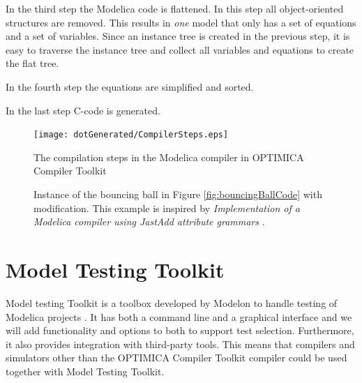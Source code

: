 \documentclass{cslthse-msc}
\begin{document}
In the third step the Modelica code is flattened. In this step all object-oriented structures are removed. This results in \emph{one} model that only has a set of equations and a set of variables. Since an instance tree is created in the previous step, it is easy to traverse the instance tree and collect all variables and equations to create the flat tree.

In the fourth step the equations are simplified and sorted.

In the last step C-code is generated. 

\begin{figure}[!htbp]
    \centering
    {\texttt{[image: dotGenerated/CompilerSteps.eps]}}
    \caption{The compilation steps in the Modelica compiler in OPTIMICA Compiler Toolkit }
    \label{fig:compilerSteps}
\end{figure}

\begin{figure}[!htbp]
    \centering
    
    \caption{Instance of the bouncing ball in Figure \ref{fig:bouncingBallCode} with modification. This example is inspired by \textit{Implementation of a Modelica compiler using JastAdd attribute grammars} \cite{aakesson2010implementation}.}
    \label{fig:bouncingBallInstance}
\end{figure}

\section{Model Testing Toolkit}
Model testing Toolkit is a toolbox developed by Modelon to handle testing of Modelica projects \cite{modelon.comMTT}. It has both a command line and a graphical interface and we will add functionality and options to both to support test selection. Furthermore, it also provides integration with third-party tools. This means that compilers and simulators other than the OPTIMICA Compiler Toolkit  compiler could be used together with Model Testing Toolkit.
\end{document}
